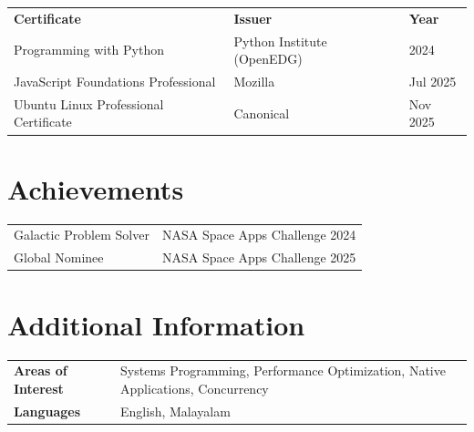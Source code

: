 \documentclass[a4paper,10pt]{article}
\begin{document}
\renewcommand{\arraystretch}{1.05}
\begin{tabular}{@{} p{7.8cm} p{6.5cm} p{2.5cm} @{}}
\textbf{Certificate}                  & \textbf{Issuer}              & \textbf{Year} \\[1pt]
Programming with Python               & Python Institute (OpenEDG)   & 2024 \\
JavaScript Foundations Professional   & Mozilla                      & Jul 2025 \\
Ubuntu Linux Professional Certificate & Canonical                    & Nov 2025 \\
\end{tabular}

\section*{Achievements}

\begin{tabular}{@{} p{9.5cm} p{8cm} @{}}
Galactic Problem Solver              & NASA Space Apps Challenge 2024 \\
Global Nominee                       & NASA Space Apps Challenge 2025 \\
\end{tabular}

\section*{Additional Information}

\begin{tabular}{@{} >{\bfseries}p{3.8cm} p{13cm} @{}}
Areas of Interest & Systems Programming, Performance Optimization, Native Applications, Concurrency \\
Languages         & English, Malayalam \\
\end{tabular}

\vspace{3pt}
\end{document}
